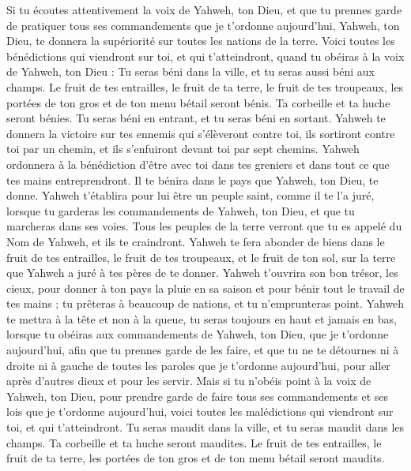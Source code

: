 \begin{multicols}{2}
\VerseOne{}Si tu écoutes attentivement la voix de Yahweh, ton Dieu, et que tu prennes garde de pratiquer tous ses commandements que je t’ordonne aujourd'hui, Yahweh, ton Dieu, te donnera la supériorité sur toutes les nations de la terre.
Voici toutes les bénédictions qui viendront sur toi, et qui t'atteindront, quand tu obéiras à la voix de Yahweh, ton Dieu :
Tu seras béni dans la ville, et tu seras aussi béni aux champs.
Le fruit de tes entrailles, le fruit de ta terre, le fruit de tes troupeaux, les portées de ton gros et de ton menu bétail seront bénis.
Ta corbeille et ta huche seront bénies.
Tu seras béni en entrant, et tu seras béni en sortant.
Yahweh te donnera la victoire sur tes ennemis qui s'élèveront contre toi, ils sortiront contre toi par un chemin, et ils s'enfuiront devant toi par sept chemins.
Yahweh ordonnera à la bénédiction d’être avec toi dans tes greniers et dans tout ce que tes mains entreprendront. Il te bénira dans le pays que Yahweh, ton Dieu, te donne.
Yahweh t'établira pour lui être un peuple saint, comme il te l'a juré, lorsque tu garderas les commandements de Yahweh, ton Dieu, et que tu marcheras dans ses voies.
Tous les peuples de la terre verront que tu es appelé du Nom de Yahweh, et ils te craindront.
Yahweh te fera abonder de biens dans le fruit de tes entrailles, le fruit de tes troupeaux, et le fruit de ton sol, sur la terre que Yahweh a juré à tes pères de te donner.
Yahweh t'ouvrira son bon trésor, les cieux, pour donner à ton pays la pluie en sa saison et pour bénir tout le travail de tes mains ; tu prêteras à beaucoup de nations, et tu n'emprunteras point.
Yahweh te mettra à la tête et non à la queue, tu seras toujours en haut et jamais en bas, lorsque tu obéiras aux commandements de Yahweh, ton Dieu, que je t’ordonne aujourd'hui, afin que tu prennes garde de les faire,
et que tu ne te détournes ni à droite ni à gauche de toutes les paroles que je t’ordonne aujourd'hui, pour aller après d'autres dieux et pour les servir.
Mais si tu n'obéis point à la voix de Yahweh, ton Dieu, pour prendre garde de faire tous ses commandements et ses lois que je t’ordonne aujourd'hui, voici toutes les malédictions qui viendront sur toi, et qui t'atteindront.
Tu seras maudit dans la ville, et tu seras maudit dans les champs.
Ta corbeille et ta huche seront maudites.
Le fruit de tes entrailles, le fruit de ta terre, les portées de ton gros et de ton menu bétail seront maudits.

\end{multicols}
